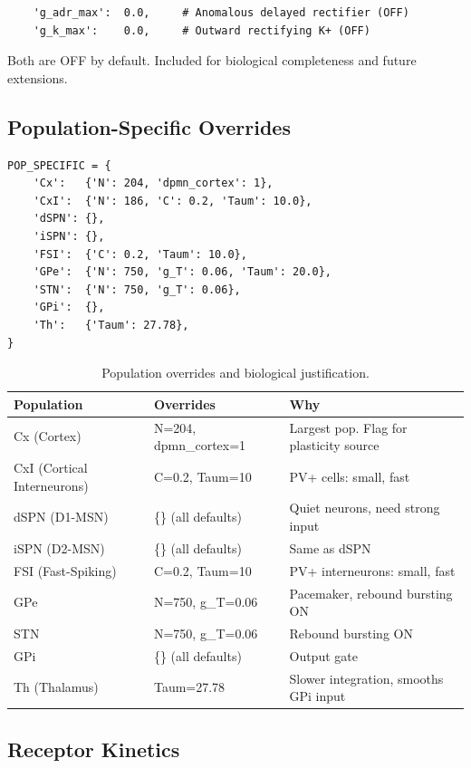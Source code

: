 \documentclass[11pt,a4paper]{article}
\begin{document}
\begin{lstlisting}
    'g_adr_max':  0.0,     # Anomalous delayed rectifier (OFF)
    'g_k_max':    0.0,     # Outward rectifying K+ (OFF)
\end{lstlisting}

Both are OFF by default. Included for biological completeness and future extensions.

\subsection{Population-Specific Overrides}

\begin{lstlisting}
POP_SPECIFIC = {
    'Cx':   {'N': 204, 'dpmn_cortex': 1},
    'CxI':  {'N': 186, 'C': 0.2, 'Taum': 10.0},
    'dSPN': {},
    'iSPN': {},
    'FSI':  {'C': 0.2, 'Taum': 10.0},
    'GPe':  {'N': 750, 'g_T': 0.06, 'Taum': 20.0},
    'STN':  {'N': 750, 'g_T': 0.06},
    'GPi':  {},
    'Th':   {'Taum': 27.78},
}
\end{lstlisting}

\begin{table}[h]
\centering
\caption{Population overrides and biological justification.}
\begin{tabular}{lll}
\toprule
Population & Overrides & Why \\
\midrule
Cx (Cortex) & N=204, dpmn\_cortex=1 & Largest pop. Flag for plasticity source \\
CxI (Cortical Interneurons) & C=0.2, Taum=10 & PV+ cells: small, fast \\
dSPN (D1-MSN) & \{\} (all defaults) & Quiet neurons, need strong input \\
iSPN (D2-MSN) & \{\} (all defaults) & Same as dSPN \\
FSI (Fast-Spiking) & C=0.2, Taum=10 & PV+ interneurons: small, fast \\
GPe & N=750, g\_T=0.06 & Pacemaker, rebound bursting ON \\
STN & N=750, g\_T=0.06 & Rebound bursting ON \\
GPi & \{\} (all defaults) & Output gate \\
Th (Thalamus) & Taum=27.78 & Slower integration, smooths GPi input \\
\bottomrule
\end{tabular}
\end{table}

\subsection{Receptor Kinetics}
\end{document}
